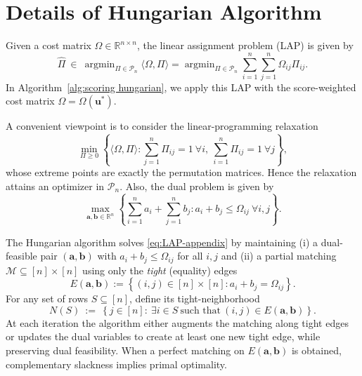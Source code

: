 \documentclass[11pt, reqno]{amsart}
\newcommand{\R}{\mathbb{R}}
\renewcommand{\hat}{\widehat}
\renewcommand{\le}{\leqslant}
\renewcommand{\ge}{\geqslant}
\newcommand{\mP}{\mathcal{P}}
\newcommand{\1}{\mbox{1}\hspace{-0.25em}\mbox{l}}
\DeclareMathOperator*{\argmin}{argmin}
\theoremstyle{definition}\newtheorem{problem}{Problem}[section]
\theoremstyle{definition}\newtheorem{definition}[problem]{Definition}
\theoremstyle{remark}\newtheorem{assumption}{Assumption}
\theoremstyle{remark}\newtheorem{remark}[problem]{Remark}
\theoremstyle{definition}\newtheorem{example}[problem]{Example}
\theoremstyle{plain}\newtheorem{theorem}[problem]{Theorem}
\theoremstyle{plain}\newtheorem{question}[problem]{Question}
\theoremstyle{plain}\newtheorem{lemma}[problem]{Lemma}
\theoremstyle{plain}\newtheorem{proposition}[problem]{Proposition}
\theoremstyle{plain}\newtheorem{corollary}[problem]{Corollary}
\theoremstyle{plain}\newtheorem{conjecture}[problem]{Conjecture}
\begin{document}
\section{Details of Hungarian Algorithm}\label{sec:hungarian alg}

Given a cost matrix $\Omega\in\R^{n\times n}$, the linear assignment problem (LAP) is given by
\begin{equation}\label{eq:LAP-appendix}
  \hat{\Pi}\ \in\ \argmin_{\Pi\in\mP_n} \langle\Omega,\Pi\rangle
  =\argmin_{\Pi\in\mP_n}\sum_{i=1}^n\sum_{j=1}^n \Omega_{ij}\Pi_{ij}.
\end{equation}
In Algorithm~\ref{alg:scoring hungarian}, we apply this LAP with the score-weighted cost matrix
$\Omega=\Omega(\bm u^*)$.

A convenient viewpoint is to consider the linear-programming relaxation
\[
\min_{\Pi\ge 0}\left\{\langle\Omega,\Pi\rangle:
\sum_{j=1}^n\Pi_{ij}=1\ \forall i,\ \sum_{i=1}^n\Pi_{ij}=1\ \forall j\right\},
\]
whose extreme points are exactly the permutation matrices. Hence the relaxation attains an optimizer in
$\mP_n$. Also, the dual problem is given by
\[
\max_{\bm a,\bm b\in\R^n}\left\{\sum_{i=1}^n a_i+\sum_{j=1}^n b_j:
a_i+b_j\le\Omega_{ij}\ \forall i,j\right\}.
\]

The Hungarian algorithm \cite{kuhn1955hungarian} solves \eqref{eq:LAP-appendix} by maintaining
(i) a dual-feasible pair $(\bm a,\bm b)$ with $a_i+b_j\le \Omega_{ij}$ for all $i,j$ and
(ii) a partial matching $\mathcal M\subseteq[n]\times[n]$ using only the \emph{tight} (equality) edges
\[
E(\bm a,\bm b) := \left\{(i,j)\in[n]\times[n]: a_i+b_j=\Omega_{ij}\right\}.
\]
For any set of rows $S\subseteq[n]$, define its tight-neighborhood
\[
N(S)\ :=\ \left\{j\in[n]:\ \exists i\in S\ \text{such that}\ (i,j)\in E(\bm a,\bm b)\right\}.
\]
At each iteration the algorithm either augments the matching along tight edges
or updates the dual variables to create at least one new tight edge, while preserving dual feasibility.
When a perfect matching on $E(\bm a,\bm b)$ is obtained, complementary slackness implies primal optimality.
\end{document}
